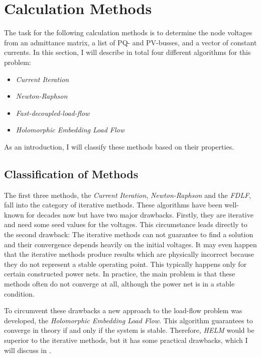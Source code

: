 \section{Calculation Methods}
\label{sec:calculation_methods}

The task for the following calculation methods is to determine the node voltages from an admittance matrix, a list of PQ- and PV-busses, and a vector of constant currents. In this section, I will describe in total four different algorithms for this problem:
\begin{itemize}
	\item \emph{Current Iteration} \citep[p. 209]{powerSystemAnalysis}
	\item \emph{Newton-Raphson} \citep[p. 232]{powerSystemAnalysis}
	\item \emph{Fast-decoupled-load-flow} \citep[p. 240]{powerSystemAnalysis}
	\item \emph{Holomorphic Embedding Load Flow} \citep{helmIEEE, helmPatentApr2009, helmPatentSept2009}
\end{itemize}

As an introduction, I will classify these methods based on their properties.

\subsection{Classification of Methods}

The first three methods, the \emph{Current Iteration}, \emph{Newton-Raphson} and the \emph{FDLF}, fall into the category of iterative methods. These algorithms have been well-known for decades now but have two major drawbacks. Firstly, they are iterative and need some seed values for the voltages. This circumstance leads directly to the second drawback: The iterative methods can not guarantee to find a solution and their convergence depends heavily on the initial voltages. It may even happen that the iterative methods produce results which are physically incorrect because they do not represent a stable operating point. This typically happens only for certain constructed power nets. In practice, the main problem is that these methods often do not converge at all, although the power net is in a stable condition.

To circumvent these drawbacks a new approach to the load-flow problem was developed, the \emph{Holomorphic Embedding Load Flow}. This algorithm guarantees to converge in theory if and only if the system is stable. Therefore, \emph{HELM} would be superior to the iterative methods, but it has some practical drawbacks, which I will discuss in . 


